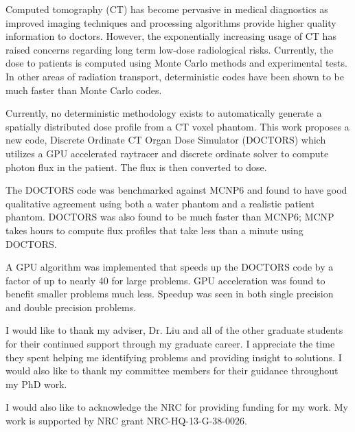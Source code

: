 \documentclass[times,12pt,titlepage]{mstthesis}
\begin{document}
\begin{ThesisAbstract}
Computed tomography (CT) has become pervasive in medical diagnostics as improved imaging techniques and processing algorithms provide higher quality information to doctors. However, the exponentially increasing usage of CT has raised concerns regarding long term low-dose radiological risks. Currently, the dose to patients is computed using Monte Carlo methods and experimental tests. In other areas of radiation transport, deterministic codes have been shown to be much faster than Monte Carlo codes.

Currently, no deterministic methodology exists to automatically generate a spatially distributed dose profile from a CT voxel phantom. This work proposes a new code, Discrete Ordinate CT Organ Dose Simulator (DOCTORS) which utilizes a GPU accelerated raytracer and discrete ordinate solver to compute photon flux in the patient. The flux is then converted to dose.

The DOCTORS code was benchmarked against MCNP6 and found to have good qualitative agreement using both a water phantom and a realistic patient phantom. DOCTORS was also found to be much faster than MCNP6; MCNP takes hours to compute flux profiles that take less than a minute using DOCTORS.

A GPU algorithm was implemented that speeds up the DOCTORS code by a factor of up to nearly 40 for large problems. GPU acceleration was found to benefit smaller problems much less. Speedup was seen in both single precision and  double precision problems.

\end{ThesisAbstract}


\begin{ThesisAcknowledgment}
I would like to thank my adviser, Dr. Liu and all of the other graduate students for their continued support through my graduate career. I appreciate the time they spent helping me identifying problems and providing insight to solutions. I would also like to thank my committee members for their guidance throughout my PhD work.

I would also like to acknowledge the NRC for providing funding for my work. My work is supported by NRC grant NRC-HQ-13-G-38-0026.
\end{ThesisAcknowledgment}

\begin{ThesisFrontMatter}
\tableofcontents
\listoffigures
\listoftables
\listofsymbols
\end{ThesisFrontMatter}
\end{document}
